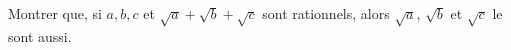 Montrer que, si $a, b, c$ et $\sqrt{a} + \sqrt{b} + \sqrt{c}$ sont rationnels, alors $\sqrt{a}$, $\sqrt{b}$ et $\sqrt{c}$ le sont aussi.

